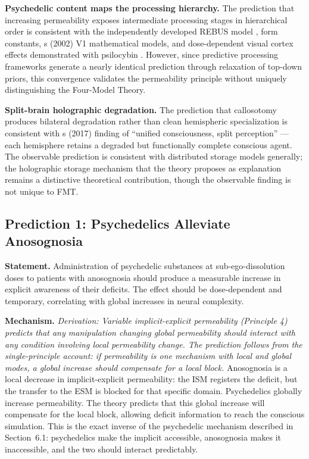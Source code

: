 \documentclass[12pt]{article}
\begin{document}
\textbf{Psychedelic content maps the processing hierarchy.} The prediction that increasing permeability exposes intermediate processing stages in hierarchical order is consistent with the independently developed REBUS model \citep{CarhartHarris2019}, \citet{Kluver1966} form constants, \citeauthor{Bressloff2002}\textquotesingle s (2002) V1 mathematical models, and dose-dependent visual cortex effects demonstrated with psilocybin \citep{Timmermann2023}. However, since predictive processing frameworks generate a nearly identical prediction through relaxation of top-down priors, this convergence validates the permeability principle without uniquely distinguishing the Four-Model Theory.

\textbf{Split-brain holographic degradation.} The prediction that callosotomy produces bilateral degradation rather than clean hemispheric specialization is consistent with \citeauthor{Pinto2017}\textquotesingle s (2017) finding of ``unified consciousness, split perception'' --- each hemisphere retains a degraded but functionally complete conscious agent. The observable prediction is consistent with distributed storage models generally; the holographic storage mechanism that the theory proposes as explanation remains a distinctive theoretical contribution, though the observable finding is not unique to FMT.


\subsection{Prediction 1: Psychedelics Alleviate Anosognosia}


\textbf{Statement.} Administration of psychedelic substances at sub-ego-dissolution doses to patients with anosognosia should produce a measurable increase in explicit awareness of their deficits. The effect should be dose-dependent and temporary, correlating with global increases in neural complexity.

\textbf{Mechanism.} \emph{Derivation: Variable implicit-explicit permeability (Principle 4) predicts that any manipulation changing global permeability should interact with any condition involving local permeability change. The prediction follows from the single-principle account: if permeability is one mechanism with local and global modes, a global increase should compensate for a local block.} Anosognosia is a local decrease in implicit-explicit permeability: the ISM registers the deficit, but the transfer to the ESM is blocked for that specific domain. Psychedelics globally increase permeability. The theory predicts that this global increase will compensate for the local block, allowing deficit information to reach the conscious simulation. This is the exact inverse of the psychedelic mechanism described in Section~6.1: psychedelics make the implicit accessible, anosognosia makes it inaccessible, and the two should interact predictably.
\end{document}
